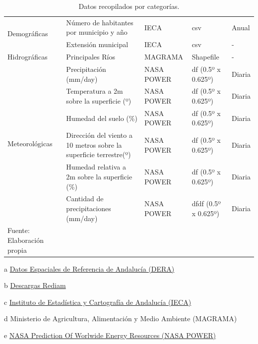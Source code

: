 \documentclass[12pt,a4paper,]{book}
\numberwithin{dummy}{section}
\theoremstyle{ocrenumbox}
\theoremstyle{blacknumex}
\theoremstyle{blacknumbox}
\theoremstyle{ocrenum}
\theoremstyle{ocrenum}
\begin{document}
\begin{table}
\begin{threeparttable}[]
{\begin{tabular}{lllll}
\multirow{2}{*}{Demográficas}   & Número de habitantes por municipio y año                       & IECA\tnote{c}       & csv                & Anual      \\
                                & Extensión municipal                                            & IECA\tnote{c}       & csv                & -      \\ \hline
Hidrográficas                   & Principales Ríos                                               & MAGRAMA\tnote{d}    & Shapefile          & -          \\ \hline
\multirow{6}{*}{Meteorológicas} & Precipitación (mm/day)                                         & NASA POWER\tnote{e} & df (0.5º x 0.625º) & Diaria     \\
                                & Temperatura a 2m sobre la superficie (º)                       & NASA POWER & df (0.5º x 0.625º) & Diaria     \\
                                & Humedad del suelo (\%)                                         & NASA POWER & df (0.5º x 0.625º) & Diaria     \\
                                & Dirección del viento a 10 metros sobre la superficie terrestre(º) & NASA POWER & df (0.5º x 0.625º) & Diaria     \\
                                & Humedad relativa a 2m sobre la superficie (\%)                 & NASA POWER & df (0.5º x 0.625º) & Diaria     \\
                                & Cantidad de precipitaciones (mm/day)                           & NASA POWER & dfdf (0.5º x 0.625º) & Diaria     \\ \hline
\footnotesize Fuente: Elaboración propia
\end{tabular}}
\begin{tablenotes}
\raggedright
\item[a] {\footnotesize \href{https://www.juntadeandalucia.es/institutodeestadisticaycartografia/dega/datos-espaciales-de-referencia-de-andalucia-dera/descarga-de-informacion}{Datos Espaciales de Referencia de Andalucía (DERA)}}
\item[b] {\footnotesize \href{https://portalrediam.cica.es/descargas?path=%2F}{Descargas Rediam}}%
\item[c] {\footnotesize \href{https://www.juntadeandalucia.es/institutodeestadisticaycartografia/dega/}{Instituto de Estadística y Cartografía de Andalucía (IECA)}}
\item[d] {\footnotesize Ministerio de Agricultura, Alimentación y Medio Ambiente (MAGRAMA)}
\item[e] {\footnotesize \href{https://power.larc.nasa.gov/#resources}{NASA Prediction Of Worlwide Energy Resources (NASA POWER)}}
\end{tablenotes}
\caption{Datos recopilados por categorías.}
\label{tab:fuentes}
\end{threeparttable}
\end{table}
\end{document}
